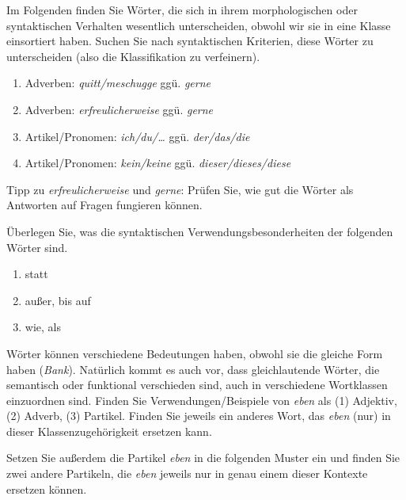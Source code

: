 \Uebung[\tristar] \label{u52} Im Folgenden finden Sie Wörter, die sich in ihrem morphologischen oder syntaktischen Verhalten wesentlich unterscheiden, obwohl wir sie in eine Klasse einsortiert haben.
Suchen Sie nach syntaktischen Kriterien, diese Wörter zu unterscheiden (also die Klassifikation zu verfeinern).

\begin{enumerate}\Lf
  \item Adverben: \textit{quitt/meschugge} ggü. \textit{gerne}
  \item Adverben: \textit{erfreulicherweise} ggü. \textit{gerne}
  \item Artikel/Pronomen: \textit{ich/du/\ldots} ggü. \textit{der/das/die}
  \item Artikel/Pronomen: \textit{kein/keine} ggü. \textit{dieser/dieses/diese}
\end{enumerate}

Tipp zu \textit{erfreulicherweise} und \textit{gerne}:
Prüfen Sie, wie gut die Wörter als Antworten auf Fragen fungieren können.

\Uebung[\tristar] \label{u53} Überlegen Sie, was die syntaktischen Verwendungsbesonderheiten der folgenden Wörter sind.

\begin{enumerate}\Lf
  \item statt
  \item außer, bis auf
  \item wie, als
\end{enumerate}

\Uebung \label{u54} Wörter können verschiedene Bedeutungen haben, obwohl sie die gleiche Form haben (\zB \textit{Bank}).
Natürlich kommt es auch vor, dass gleichlautende Wörter, die semantisch oder funktional verschieden sind, auch in verschiedene Wortklassen einzuordnen sind.
Finden Sie Verwendungen/Beispiele von \textit{eben} als (1) Adjektiv, (2) Adverb, (3) Partikel.
Finden Sie jeweils ein anderes Wort, das \textit{eben} (nur) in dieser Klassenzugehörigkeit ersetzen kann.

Setzen Sie außerdem die Partikel \textit{eben} in die folgenden Muster ein und finden Sie zwei andere Partikeln, die \textit{eben} jeweils nur in genau einem dieser Kontexte ersetzen können.

\begin{exe}
\end{exe}


